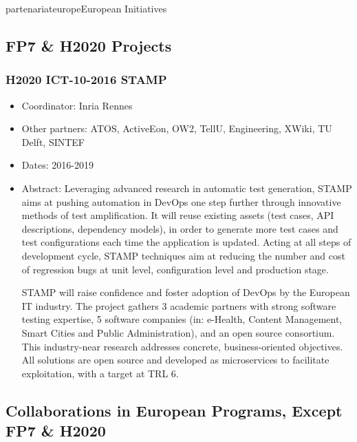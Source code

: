 \documentclass{ra2018}
\begin{document}
\begin{module}{partenariat}{europe}{European Initiatives}

\subsection{FP7 \& H2020 Projects}

\subsubsection*{\label{project:stamp} H2020 ICT-10-2016 STAMP}
\begin{itemize}
	\item Coordinator: Inria Rennes
	\item Other partners: ATOS, ActiveEon, OW2, TellU, Engineering, XWiki, TU Delft, SINTEF
	\item Dates: 2016-2019
	\item Abstract: Leveraging advanced research in automatic test generation, STAMP aims at pushing automation in DevOps one step further through innovative methods of test amplification. It will reuse existing assets (test cases, API descriptions, dependency models), in order to generate more test cases and test configurations each time the application is updated. Acting at all steps of development cycle, STAMP techniques aim at reducing the number and cost of regression bugs at unit level, configuration level and production stage.
	
	STAMP will raise confidence and foster adoption of DevOps by the European IT industry. The project gathers 3 academic partners with strong software testing expertise, 5 software companies (in: e-Health, Content Management, Smart Cities and Public Administration), and an open source consortium. This industry-near research addresses concrete, business-oriented objectives. All solutions are open source and developed as microservices to facilitate exploitation, with a target at TRL 6.  
\end{itemize}
%




\subsection{Collaborations in European Programs, Except FP7 \& H2020}


\end{module}
\end{document}
